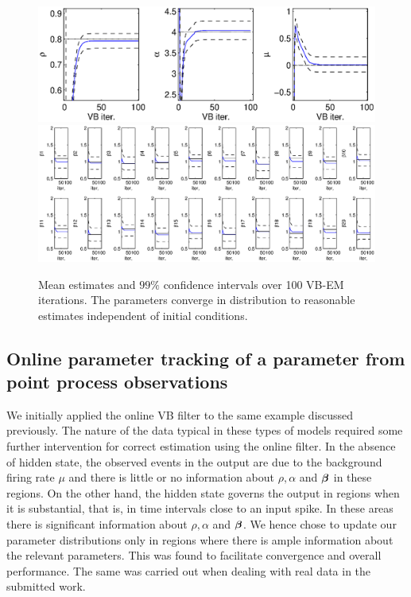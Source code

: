 \documentclass{article}
\begin{document}
\begin{figure}[ht]
\begin{center}
  \includegraphics[width = 6in]{./Figures/parVB.eps}
   \includegraphics[width = 6in]{./Figures/betaVB.eps}
\end{center}
\caption{Mean estimates and $99\%$ confidence intervals over 100 VB-EM iterations. The parameters converge in distribution to reasonable estimates independent of initial conditions.} \label{fig:parVB}
\end{figure}

\subsection{Online parameter tracking of a parameter from point process observations}

 We initially applied the online VB filter to the same example discussed previously. The nature of the data typical in these types of models required some further intervention for correct estimation using the online filter. In the absence of hidden state, the observed events in the output are due to the background firing rate $\mu$ and there is little or no information about $\rho, \alpha$ and ${\bm \beta}$ in these regions. On the other hand, the hidden state governs the output in regions when it is substantial, that is, in time intervals close to an input spike. In these areas there is significant information about $\rho, \alpha$ and ${\bm \beta}$. We hence chose to update our parameter distributions only in regions where there is ample information about the relevant parameters. This was found to facilitate convergence and overall performance. The same was carried out when dealing with real data in the submitted work.
\end{document}
